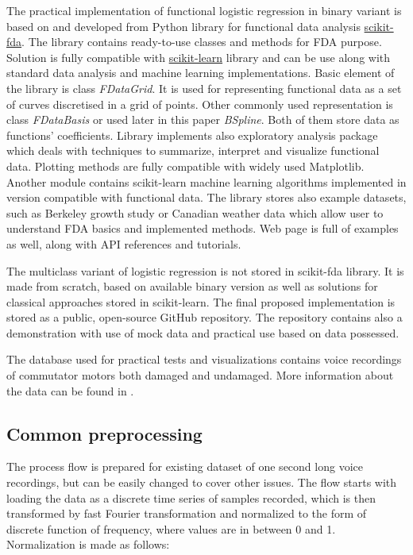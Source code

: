 \documentclass[energies,article,submit,pdftex,moreauthors]{Definitions/mdpi}
\begin{document}
The practical implementation of functional logistic regression in binary variant is based on and developed from Python library for functional data analysis \href{https://fda.readthedocs.io/en/latest/index.html}{scikit-fda}. The library contains ready-to-use classes and methods for FDA purpose. Solution is fully compatible with \href{https://scikit-learn.org/}{scikit-learn} library and can be use along with standard data analysis and machine learning implementations. Basic element of the library is class \textit{FDataGrid}. It is used for representing functional data as a set of curves discretised in a grid of points. Other commonly used representation is class \textit{FDataBasis} or used later in this paper \textit{BSpline}. Both of them store data as functions' coefficients. Library implements also exploratory analysis package which deals with techniques to summarize, interpret and visualize functional data. Plotting methods are fully compatible with widely used Matplotlib. Another module contains scikit-learn machine learning algorithms implemented in version compatible with functional data. The library stores also example datasets, such as Berkeley growth study or Canadian weather data which allow user to understand FDA basics and implemented methods. Web page is full of examples as well, along with API references and tutorials.

The multiclass variant of logistic regression is not stored in scikit-fda library. It is made from scratch, based on available binary version as well as solutions for classical approaches stored in scikit-learn. The final proposed implementation is stored as a public, open-source GitHub repository. The repository contains also a demonstration with use of mock data and practical use based on data possessed.

The database used for practical tests and visualizations contains voice recordings of commutator motors both damaged and undamaged. More information about the data can be found in \cite{ref-motors}.


\subsection{Common preprocessing}

The process flow is prepared for existing dataset of one second long voice recordings, but can be easily changed to cover other issues. The flow starts with loading the data as a discrete time series of samples recorded, which is then transformed by fast Fourier transformation and normalized to the form of discrete function of frequency, where values are in between 0 and 1. Normalization is made as follows:
\end{document}
